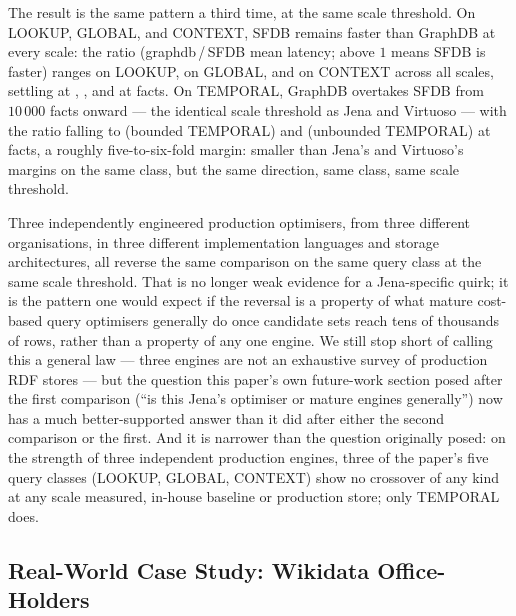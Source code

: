 

The result is the same pattern a third time, at the same scale
threshold. On LOOKUP, GLOBAL, and CONTEXT, SFDB remains faster than GraphDB at
every scale: the ratio (graphdb\,/\,SFDB mean latency; above $1$ means
SFDB is faster) ranges \rangelookupgraphdb{} on LOOKUP,
\rangeglobalgraphdb{} on GLOBAL, and \rangecontextgraphdb{} on CONTEXT across all scales, settling at
\lookupgraphdblarge{}, \globalgraphdblarge{}, and \contextgraphdblarge{} at \graphdblargescale{}
facts. On TEMPORAL, GraphDB overtakes SFDB from $10\,000$
facts onward --- the identical scale threshold as Jena and Virtuoso ---
with the ratio falling to
\temporalgraphdblarge{} (bounded TEMPORAL) and
\temporalunbgraphdblarge{} (unbounded TEMPORAL) at \graphdblargescale{}
facts, a roughly five-to-six-fold margin: smaller than Jena's and
Virtuoso's margins on the same class, but the same direction, same
class, same scale
threshold.

Three independently engineered production optimisers, from three
different organisations, in three different implementation languages
and storage architectures, all reverse the same comparison on the same
query class at the same scale threshold. That is no longer weak
evidence for a Jena-specific quirk; it is the pattern one would expect
if the reversal is a property of what mature cost-based query
optimisers generally do once candidate sets reach tens of thousands of
rows, rather than a property of any one engine. We still stop short of
calling this a general law --- three engines are not an exhaustive
survey of production RDF stores --- but the question this paper's own future-work section posed after
the first comparison (``is this Jena's optimiser or mature engines
generally'') now has a much better-supported answer than it did after
either the second comparison or the first. And it is narrower than the
question originally posed: on the strength of three independent
production engines, three of the paper's five query classes
(LOOKUP, GLOBAL, CONTEXT) show no crossover of any kind at any scale
measured, in-house baseline or production store; only TEMPORAL does.

\subsection{Real-World Case Study: Wikidata Office-Holders}
\label{sec:eval:wikidata}

